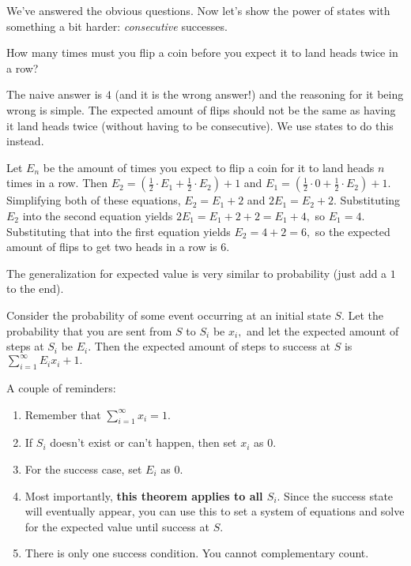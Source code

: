 \documentclass[mast]{lucky}
\begin{document}
We've answered the obvious questions. Now let's show the power of states with something a bit harder: \textit{consecutive} successes.

\begin{exam}
How many times must you flip a coin before you expect it to land heads twice in a row?
\end{exam}

The naive answer is $4$ (and it is the wrong answer!) and the reasoning for it being wrong is simple. The expected amount of flips should not be the same as having it land heads twice (without having to be consecutive). We use states to do this instead.

\begin{sol}
Let $E_n$ be the amount of times you expect to flip a coin for it to land heads $n$ times in a row. Then $E_2=(\frac{1}{2}\cdot E_1+\frac{1}{2}\cdot E_2)+1$ and $E_1=(\frac{1}{2}\cdot 0+\frac{1}{2}\cdot E_2)+1.$ Simplifying both of these equations, $E_2=E_1+2$ and $2E_1=E_2+2.$ Substituting $E_2$ into the second equation yields $2E_1=E_1+2+2=E_1+4,$ so $E_1=4.$ Substituting that into the first equation yields $E_2=4+2=6,$ so the expected amount of flips to get two heads in a row is $6.$
\end{sol}

The generalization for expected value is very similar to probability (just add a $1$ to the end).

\begin{theo}
Consider the probability of some event occurring at an initial state $S.$ Let the probability that you are sent from $S$ to $S_i$ be $x_i,$ and let the expected amount of steps at $S_i$ be $E_i.$ Then the expected amount of steps to success at $S$ is $\sum\limits_{i=1}^{\infty}E_ix_i+1.$
\end{theo}

A couple of reminders:

\begin{enumerate}

    \item Remember that $\sum\limits_{i=1}^{\infty}x_i=1.$
    
    \item If $S_i$ doesn't exist or can't happen, then set $x_i$ as $0.$
    
    \item For the success case, set $E_i$ as $0.$
    
    \item Most importantly, \textbf{this theorem applies to all $S_i.$} Since the success state will eventually appear, you can use this to set a system of equations and solve for the expected value until success at $S.$
    
    \item There is only one success condition. You cannot complementary count.
\end{enumerate}
\end{document}
